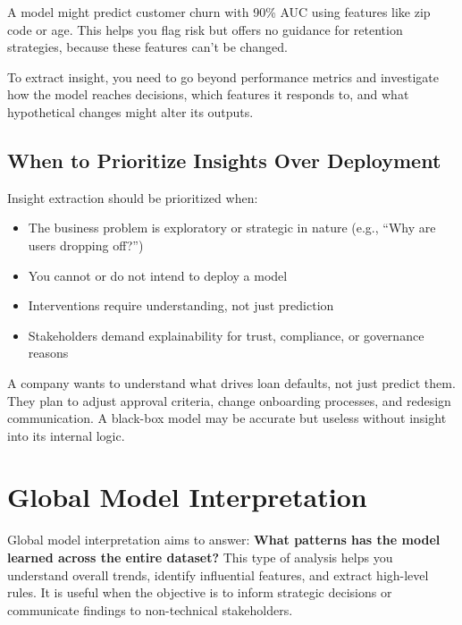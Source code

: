 \documentclass[12pt,openany]{book}
\begin{document}
\begin{examplebox}
A model might predict customer churn with 90\% AUC using features like zip code or age. This helps you flag risk but offers no guidance for retention strategies, because these features can’t be changed.
\end{examplebox}

To extract insight, you need to go beyond performance metrics and investigate how the model reaches decisions, which features it responds to, and what hypothetical changes might alter its outputs.



\section{When to Prioritize Insights Over Deployment}

Insight extraction should be prioritized when:
\begin{itemize}
  \item The business problem is exploratory or strategic in nature (e.g., ``Why are users dropping off?'')
  \item You cannot or do not intend to deploy a model
  \item Interventions require understanding, not just prediction
  \item Stakeholders demand explainability for trust, compliance, or governance reasons
\end{itemize}

\begin{examplebox}
A company wants to understand what drives loan defaults, not just predict them. They plan to adjust approval criteria, change onboarding processes, and redesign communication. A black-box model may be accurate but useless without insight into its internal logic.
\end{examplebox}




\chapter{Global Model Interpretation}

Global model interpretation aims to answer: \textbf{What patterns has the model learned across the entire dataset?} This type of analysis helps you understand overall trends, identify influential features, and extract high-level rules. It is useful when the objective is to inform strategic decisions or communicate findings to non-technical stakeholders.
\end{document}
